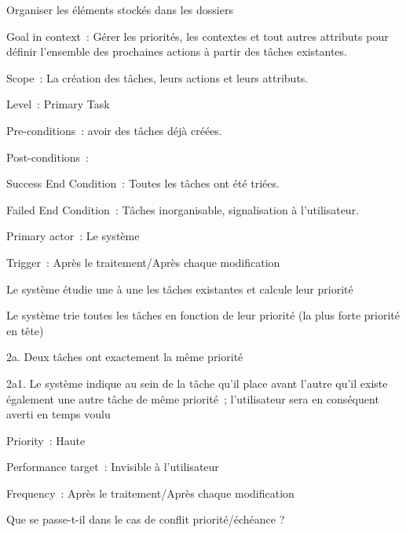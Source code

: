\begin{usecase}{Organiser les éléments stockés dans les dossiers}
\begin{information}
\item[Goal in context~:] Gérer les priorités, les contextes et tout autres attributs pour définir l'ensemble des prochaines actions à partir des tâches existantes.
\item[Scope~:] La création des tâches, leurs actions et leurs attributs.
\item[Level~:] Primary Task
\item[Pre-conditions~:] avoir des tâches déjà créées.
\item[Post-conditions~:]
\item[Success End Condition~:] Toutes les tâches ont été triées.
\item[Failed End Condition~:] Tâches inorganisable, signalisation à l'utilisateur.
\item[Primary actor~:] Le système
\item[Trigger~:] Après le traitement/Après chaque modification
\\
\end{information}
\begin{scenario}
\item Le système étudie une à une les tâches existantes et calcule leur priorité
\item Le système trie toutes les tâches en fonction de leur priorité (la plus forte priorité en tête)
\\
\end{scenario}
\begin{variation}
\item[2a.] Deux tâches ont exactement la même priorité
\item[2a1.] Le système indique au sein de la tâche qu'il place avant l'autre qu'il existe également une autre tâche de même priorité~; l'utilisateur sera en conséquent averti en temps voulu
\end{variation}
\begin{relatedinformation}
\item[Priority~:] Haute
\item[Performance target~:] Invisible à l'utilisateur
\item[Frequency~:] Après le traitement/Après chaque modification
\\
\end{relatedinformation}
\begin{openissues}
\item Que se passe-t-il dans le cas de conflit priorité/échéance ?
\\
\end{openissues}
\end{usecase}


